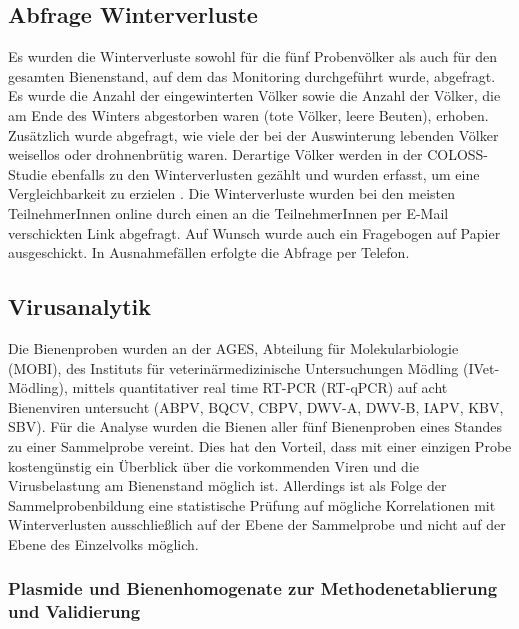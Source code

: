 \subsection{Abfrage Winterverluste} \label{chap:erhebung_winterv}

Es wurden die Winterverluste sowohl für die fünf Probenvölker als auch für den gesamten Bienenstand, auf dem das Monitoring durchgeführt wurde, abgefragt. Es wurde die Anzahl der eingewinterten Völker sowie die Anzahl der Völker, die am Ende des Winters abgestorben waren (tote Völker, leere Beuten), erhoben. Zusätzlich wurde abgefragt, wie viele der bei der Auswinterung lebenden Völker weisellos oder drohnenbrütig waren. Derartige Völker werden in der COLOSS-Studie ebenfalls zu den Winterverlusten gezählt und wurden erfasst, um eine Vergleichbarkeit zu erzielen \citep{brodschneider2016,brodschneider2018, brodschneider2019b}. Die Winterverluste wurden bei den meisten TeilnehmerInnen online durch einen an die TeilnehmerInnen per E-Mail verschickten Link abgefragt. Auf Wunsch wurde auch ein Fragebogen auf Papier ausgeschickt. In Ausnahmefällen erfolgte die Abfrage per Telefon.

\subsection{Virusanalytik} \label{chap:virusanalytik}

Die Bienenproben wurden an der AGES, Abteilung für Molekularbiologie (MOBI), des Instituts für veterinärmedizinische Untersuchungen Mödling (IVet-Mödling), mittels quantitativer real time RT-PCR (RT-qPCR) auf acht Bienenviren untersucht (ABPV, BQCV, CBPV, DWV-A, DWV-B, IAPV, KBV, SBV). 
Für die Analyse wurden die Bienen aller fünf Bienenproben eines Standes zu einer Sammelprobe vereint. Dies hat den Vorteil, dass mit einer einzigen Probe kostengünstig ein Überblick über die vorkommenden Viren und die Virusbelastung am Bienenstand möglich ist. Allerdings ist als Folge der Sammelprobenbildung eine statistische Prüfung auf mögliche Korrelationen mit Winterverlusten ausschließlich auf der Ebene der Sammelprobe und nicht auf der Ebene des Einzelvolks möglich.

\subsubsection{Plasmide und Bienenhomogenate zur Methodenetablierung und Validierung} \label{chap:plasmide_homogenate}

